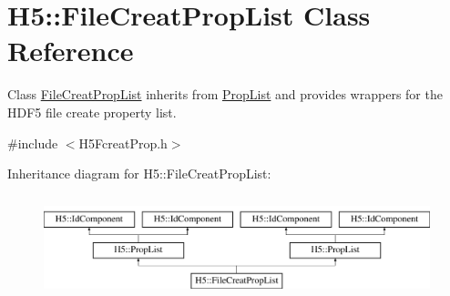 \hypertarget{class_h5_1_1_file_creat_prop_list}{}\section{H5\+:\+:File\+Creat\+Prop\+List Class Reference}
\label{class_h5_1_1_file_creat_prop_list}


Class \hyperlink{class_h5_1_1_file_creat_prop_list}{File\+Creat\+Prop\+List} inherits from \hyperlink{class_h5_1_1_prop_list}{Prop\+List} and provides wrappers for the H\+D\+F5 file create property list.  




{\ttfamily \#include $<$H5\+Fcreat\+Prop.\+h$>$}

Inheritance diagram for H5\+:\+:File\+Creat\+Prop\+List\+:\begin{figure}[H]
\begin{center}
\leavevmode
\includegraphics[height=3.000000cm]{class_h5_1_1_file_creat_prop_list}
\end{center}
\end{figure}
